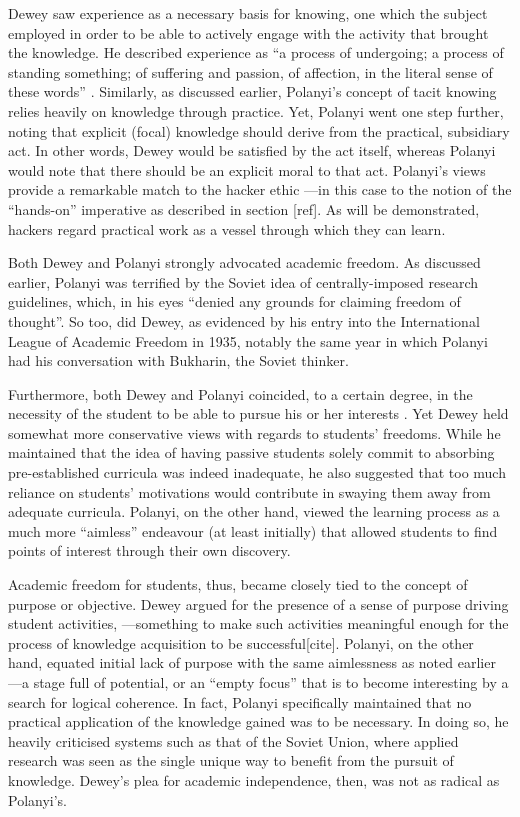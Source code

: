 Dewey saw experience as a necessary basis for knowing, one which the subject employed in order to be able to actively engage with the activity that brought the knowledge. He described experience as ``a process of undergoing; a process of standing something; of suffering and passion, of affection, in the literal sense of these words'' \citep{dewey81}. Similarly, as discussed earlier, Polanyi's concept of tacit knowing relies heavily on knowledge through practice. Yet, Polanyi went one step further, noting that explicit (focal) knowledge should derive from the practical, subsidiary act. In other words, Dewey would be satisfied by the act itself, whereas Polanyi would note that there should be an explicit moral to that act. Polanyi's views provide a remarkable match to the hacker ethic ---in this case to the notion of the ``hands-on'' imperative as described in section [ref]. As will be demonstrated, hackers regard practical work as a vessel through which they can learn.


Both Dewey and Polanyi strongly advocated academic freedom. As discussed earlier, Polanyi was terrified by the Soviet idea of centrally-imposed research guidelines, which, in his eyes ``denied any grounds for claiming freedom of thought''. So too, did Dewey, as evidenced by his entry into the International League of Academic Freedom in 1935, notably the same year in which Polanyi had his conversation with Bukharin, the Soviet thinker.

Furthermore, both Dewey and Polanyi coincided, to a certain degree, in the necessity of the student to be able to pursue his or her interests \citep{schon92}. Yet Dewey held somewhat more conservative views with regards to students' freedoms. While he maintained that the idea of having passive students solely commit to absorbing pre-established curricula was indeed inadequate, he also suggested that too much reliance on students' motivations would contribute in swaying them away from adequate curricula. Polanyi, on the other hand, viewed the learning process as a much more ``aimless'' endeavour (at least initially) that allowed students to find points of interest through their own discovery. 

Academic freedom for students, thus, became closely tied to the concept of purpose or objective. Dewey argued for the presence of a sense of purpose driving student activities, ---something to make such activities meaningful enough for the process of knowledge acquisition to be successful[cite]. Polanyi, on the other hand, equated initial lack of purpose with the same aimlessness as noted earlier ---a stage full of potential, or an ``empty focus'' that is to become interesting by a search for logical coherence. In fact, Polanyi specifically maintained that no practical application of the knowledge gained was to be necessary. In doing so, he heavily criticised systems such as that of the Soviet Union, where applied research was seen as the single unique way to benefit from the pursuit of knowledge. Dewey's plea for academic independence, then, was not as radical as Polanyi's. 

